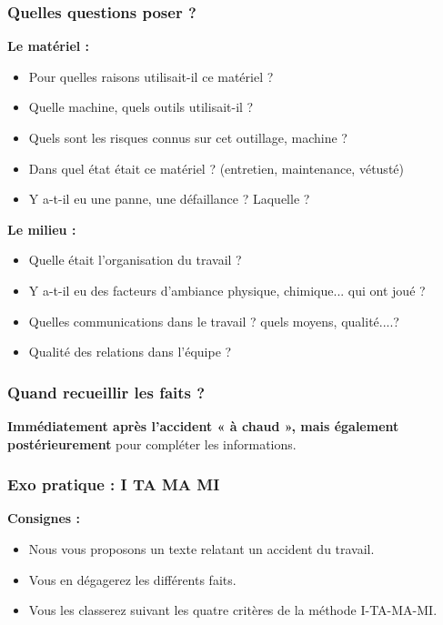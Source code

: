 \documentclass{beamer}
\begin{document}
\begin{frame}
\frametitle{Quelles questions poser ?}

\textbf{Le matériel :}
\begin{itemize}
\item Pour quelles raisons utilisait-il ce matériel ?
\item Quelle machine, quels outils utilisait-il ?
\item Quels sont les risques connus sur cet outillage, machine ?
\item Dans quel état était ce matériel ? (entretien, maintenance, vétusté)
\item Y a-t-il eu une panne, une défaillance ? Laquelle ?
\end{itemize}

\textbf{Le milieu :}
\begin{itemize}
\item Quelle était l’organisation du travail ?
\item  Y a-t-il eu des facteurs d’ambiance physique, chimique... qui ont joué ?
\item  Quelles communications dans le travail ? quels moyens, qualité....?
\item  Qualité des relations dans l’équipe ?
\end{itemize}
\end{frame}

\begin{frame}
\frametitle{Quand recueillir les faits ?}

\textbf{Immédiatement après l’accident « à chaud », 
mais également postérieurement} pour compléter les informations.
\end{frame}

\begin{frame}
\frametitle{Exo pratique : I TA MA MI}

\textbf{Consignes :}
\begin{itemize}
\item Nous vous proposons un texte relatant un accident du travail.
\item Vous en dégagerez les différents faits.
\item Vous les classerez suivant les quatre critères de la méthode I-TA-MA-MI.
\end{itemize}
\end{frame}
\end{document}
